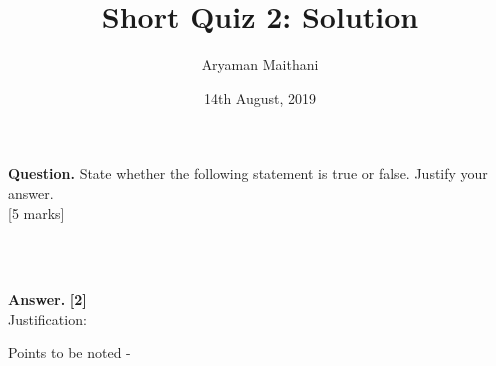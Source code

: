 \documentclass{article}
\title{Short Quiz 2: Solution}      %
\author{Aryaman Maithani}
\date{14th August, 2019}			 %
\begin{document}
\maketitle

\hrulefill

\textbf{Question.} State whether the following statement is true or false. Justify your answer.\\ 
\hfill [5 marks]
\begin{flushright}
	\\~\\
\end{flushright}

\hrulefill

\textbf{Answer.}  \hfill \textbf{[2]}\\  %
Justification: 

\hrulefill

\vspace{0.2 cm}

Points to be noted -
\begin{enumerate} 
\end{enumerate}
\end{document}
